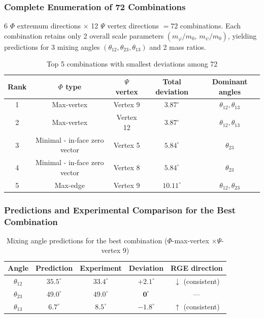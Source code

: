 \documentclass[12pt,a4paper,twocolumn]{article}
\renewcommand{\phi}{\varphi}
\begin{document}
\subsubsection{Complete Enumeration of 72 Combinations}

6 $\Phi$ extremum directions $\times$ 12 $\Psi$ vertex directions $= 72$ combinations. Each combination retains only 2 overall scale parameters $(m_\phi/m_0, \, m_\psi/m_0)$, yielding predictions for 3 mixing angles $(\theta_{12}, \theta_{23}, \theta_{13})$ and 2 mass ratios.

\begin{table}[htbp]
\centering
\caption{Top 5 combinations with smallest deviations among 72}
\label{tab:72_combos_en}
\begin{tabular}{ccccc}
\hline
Rank & $\Phi$ type & $\Psi$ vertex & Total deviation & Dominant angles \\
\hline
1 & Max-vertex & Vertex 9 & $3.87^\circ$ & $\theta_{12},\theta_{13}$ \\
2 & Max-vertex & Vertex 12 & $3.87^\circ$ & $\theta_{12},\theta_{13}$ \\
3 & Minimal - in-face zero vector & Vertex 5 & $5.84^\circ$ & $\theta_{23}$ \\
4 & Minimal - in-face zero vector & Vertex 8 & $5.84^\circ$ & $\theta_{23}$ \\
5 & Max-edge & Vertex 9 & $10.11^\circ$ & $\theta_{12},\theta_{23}$ \\
\hline
\end{tabular}
\end{table}

\subsubsection{Predictions and Experimental Comparison for the Best Combination}

\begin{table}[htbp]
\centering
\caption{Mixing angle predictions for the best combination ($\Phi$-max-vertex $\times \Psi$-vertex 9)}
\label{tab:mixing_angles_en}
\begin{tabular}{ccccc}
\hline
Angle & Prediction & Experiment & Deviation & RGE direction \\
\hline
$\theta_{12}$ & $35.5^\circ$ & $33.4^\circ$ & $+2.1^\circ$ & $\downarrow$ (consistent) \\
$\theta_{23}$ & $49.0^\circ$ & $49.0^\circ$ & $\mathbf{0^\circ}$ & --- \\
$\theta_{13}$ & $6.7^\circ$ & $8.5^\circ$ & $-1.8^\circ$ & $\uparrow$ (consistent) \\
\hline
\end{tabular}
\end{table}
\end{document}
